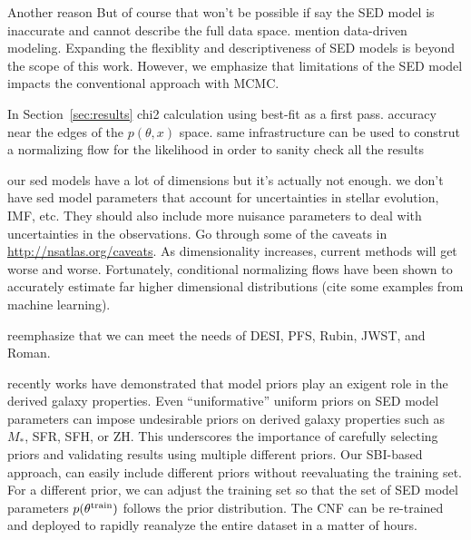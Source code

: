 Another reason 
But of course that won't be possible if say the SED model is inaccurate and
cannot describe the full data space.  
mention data-driven modeling. 
Expanding the flexiblity and descriptiveness of SED models is beyond the scope
of this work. 
However, we emphasize that limitations of the SED model impacts the
conventional approach with MCMC. 

In Section~\ref{sec:results}
chi2 calculation using best-fit as a first pass. 
accuracy near the edges of the $p(\theta, x)$ space. same infrastructure can be
used to construt a normalizing flow for the likelihood in order to sanity check
all the results 

our sed models have a lot of dimensions but it's actually not enough. 
we don't have sed model parameters that account for uncertainties in stellar
evolution, IMF, etc. 
They should also include more nuisance parameters to deal with uncertainties in
the observations. 
Go through some of the caveats in \url{http://nsatlas.org/caveats}. 
As dimensionality increases, current methods will get worse and worse. 
Fortunately, conditional normalizing flows have been shown to accurately
estimate far higher dimensional distributions (cite some examples from machine
learning). 

reemphasize that we can meet the needs of DESI, PFS, Rubin, JWST, and Roman. 

recently works have demonstrated that model priors play an exigent role in the
derived galaxy properties. 
Even ``uniformative'' uniform priors on SED model parameters can impose
undesirable priors on derived galaxy properties such as $M_*$, SFR, SFH, or
ZH.
This underscores the importance of carefully selecting priors and validating
results using multiple different priors. 
Our SBI-based approach, can easily include different priors without
reevaluating the training set.
For a different prior, we can adjust the training set so that the set of SED
model parameters $p(\theta^{\rm train})$ follows the prior distribution. 
The CNF can be re-trained and deployed to rapidly reanalyze the entire dataset
in a matter of hours. 

